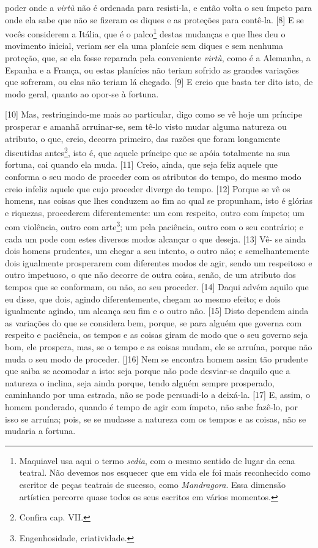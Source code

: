 poder onde a \emph{virtù} não é ordenada para resisti-la, e então volta
o seu ímpeto para onde ela sabe que não se fizeram os diques e as
proteções para contê-la. {[}8{]} E se vocês considerem a Itália, que é o
palco\footnote{Maquiavel usa aqui o termo \emph{sedia}, com o mesmo
  sentido de lugar da cena teatral. Não devemos nos esquecer que em vida
  ele foi mais reconhecido como escritor de peças teatrais de sucesso,
  como \emph{Mandragora}. Essa dimensão artística percorre quase todos
  os seus escritos em vários momentos.} destas mudanças e que lhes deu o
movimento inicial, veriam ser ela uma planície sem diques e sem nenhuma
proteção, que, se ela fosse reparada pela conveniente \emph{virtù}, como
é a Alemanha, a Espanha e a França, ou estas planícies não teriam
sofrido as grandes variações que sofreram, ou elas não teriam lá
chegado. {[}9{]} E creio que basta ter dito isto, de modo geral, quanto
ao opor-se à fortuna.

{[}10{]} Mas, restringindo-me mais ao particular, digo como se vê hoje
um príncipe prosperar e amanhã arruinar-se, sem tê-lo visto mudar alguma
natureza ou atributo, o que, creio, decorra primeiro, das razões que
foram longamente discutidas antes\footnote{Confira cap. VII.}, isto é,
que aquele príncipe que se apóia totalmente na sua fortuna, cai quando
ela muda. {[}11{]} Creio, ainda, que seja feliz aquele que conforma o
seu modo de proceder com os atributos do tempo, do mesmo modo creio
infeliz aquele que cujo proceder diverge do tempo. {[}12{]} Porque se vê
os homens, nas coisas que lhes conduzem ao fim ao qual se propunham,
isto é glórias e riquezas, procederem diferentemente: um com respeito,
outro com ímpeto; um com violência, outro com arte\footnote{Engenhosidade,
  criatividade.}; um pela paciência, outro com o seu contrário; e cada
um pode com estes diversos modos alcançar o que deseja. {[}13{]} Vê- se
ainda dois homens prudentes, um chegar a seu intento, o outro não; e
semelhantemente dois igualmente prosperarem com diferentes modos de
agir, sendo um respeitoso e outro impetuoso, o que não decorre de outra
coisa, senão, de um atributo dos tempos que se conformam, ou não, ao seu
proceder. {[}14{]} Daqui advém aquilo que eu disse, que dois, agindo
diferentemente, chegam ao mesmo efeito; e dois igualmente agindo, um
alcança seu fim e o outro não. {[}15{]} Disto dependem ainda as
variações do que se considera bem, porque, se para alguém que governa
com respeito e paciência, os tempos e as coisas giram de modo que o seu
governo seja bom, ele prospera, mas, se o tempo e as coisas mudam, ele
se arruína, porque não muda o seu modo de proceder. {[]}16{]} Nem se encontra homem assim tão prudente que saiba se acomodar a isto: seja porque não pode desviar-se daquilo que a natureza o inclina, seja ainda porque, tendo alguém sempre prosperado, caminhando por uma estrada, não se pode persuadi-lo a deixá-la. {[}17{]} E, assim, o homem ponderado, quando é tempo de agir com ímpeto, não sabe fazê-lo, por isso se arruína; pois, se se mudasse a natureza com os tempos e as coisas, não se mudaria a fortuna.


